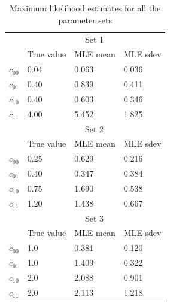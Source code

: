 \documentclass{article}
\begin{document}
\begin{table}
\caption{Maximum likelihood estimates for all the parameter sets}
\centering
\begin{tabular}{llll}
    \rowcolor[rgb]{0.796,0.796,0.796} \multicolumn{1}{c}{} & \multicolumn{3}{c}{Set 1}         \\
    \rowcolor[rgb]{0.878,0.878,0.878}                      & True value & MLE mean & MLE sdev  \\
    {\cellcolor[rgb]{0.878,0.878,0.878}}$c_{00}$            & 0.04       & 0.063    & 0.036     \\
    {\cellcolor[rgb]{0.878,0.878,0.878}}$c_{01}$            & 0.40       & 0.839    & 0.411     \\
    {\cellcolor[rgb]{0.878,0.878,0.878}}$c_{10}$            & 0.40       & 0.603    & 0.346     \\
    {\cellcolor[rgb]{0.878,0.878,0.878}}$c_{11}$            & 4.00       & 5.452    & 1.825     \\
    \rowcolor[rgb]{0.796,0.796,0.796}                      & \multicolumn{3}{c}{Set 2}         \\
    \rowcolor[rgb]{0.878,0.878,0.878}                      & True value & MLE mean & MLE sdev  \\
    {\cellcolor[rgb]{0.878,0.878,0.878}}$c_{00}$            & 0.25       & 0.629    & 0.216     \\
    {\cellcolor[rgb]{0.878,0.878,0.878}}$c_{01}$            & 0.40       & 0.347    & 0.384     \\
    {\cellcolor[rgb]{0.878,0.878,0.878}}$c_{10}$            & 0.75       & 1.690    & 0.538     \\
    {\cellcolor[rgb]{0.878,0.878,0.878}}$c_{11}$            & 1.20       & 1.438    & 0.667     \\
    \rowcolor[rgb]{0.796,0.796,0.796}                      & \multicolumn{3}{c}{Set 3}         \\
    \rowcolor[rgb]{0.878,0.878,0.878}                      & True value & MLE mean & MLE sdev  \\
    {\cellcolor[rgb]{0.878,0.878,0.878}}$c_{00}$            & 1.0        & 0.381    & 0.120     \\
    {\cellcolor[rgb]{0.878,0.878,0.878}}$c_{01}$            & 1.0        & 1.409    & 0.322     \\
    {\cellcolor[rgb]{0.878,0.878,0.878}}$c_{10}$            & 2.0        & 2.088    & 0.901     \\
    {\cellcolor[rgb]{0.878,0.878,0.878}}$c_{11}$            & 2.0        & 2.113    & 1.218    
\end{tabular}
\label{tab:table1}
\end{table}
\end{document}
